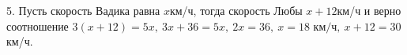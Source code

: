 5. Пусть скорость Вадика равна $x$км/ч, тогда скорость Любы $x+12$км/ч и верно соотношение $3(x+12)=5x,\ 3x+36=5x,\ 2x=36,\ x=18\text{ км/ч},\ x+12=30$км/ч.\\
